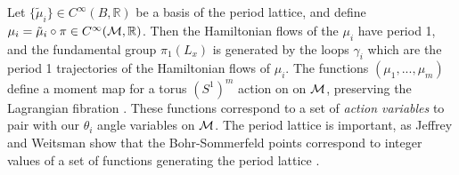 	Let $\{\tilde{\mu}_i\}\in C^\infty(B,\mathbb{R})$ be a basis of the period lattice, and define $\mu_i = \tilde{\mu}_i\circ \pi \in C^\infty(\mathcal{M},\mathbb{R})$. Then the Hamiltonian flows of the $\mu_i$ have period 1, and the fundamental group $\pi_1(L_x)$ is generated by the loops $\gamma_i$ which are the period 1 trajectories of the Hamiltonian flows of $\mu_i$. The functions $(\mu_1,...,\mu_m)$ define a moment map for a torus $(S^1)^m$ action on on $\mathcal{M}$, preserving the Lagrangian fibration \cite[\S4]{jeffrey_bohr-sommerfeld_1992}. These functions correspond to a set of \emph{action variables} to pair with our $\theta_i$ angle variables on $\mathcal{M}$. The period lattice is important, as Jeffrey and Weitsman show that the Bohr-Sommerfeld points correspond to integer values of a set of functions generating the period lattice \cite[\S5]{jeffrey_bohr-sommerfeld_1992}. 
	
